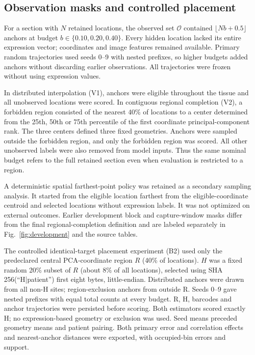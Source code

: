 \subsection{Observation masks and controlled placement}
For a section with $N$ retained locations, the observed set $\mathcal O$ contained $\lfloor Nb+0.5\rfloor$ anchors at budget $b\in\{0.10, 0.20, 0.40\}$. Every hidden location lacked its entire expression vector; coordinates and image features remained available. Primary random trajectories used seeds 0--9 with nested prefixes, so higher budgets added anchors without discarding earlier observations. All trajectories were frozen without using expression values.

In distributed interpolation (V1), anchors were eligible throughout the tissue and all unobserved locations were scored. In contiguous regional completion (V2), a forbidden region consisted of the nearest 40\% of locations to a center determined from the 25th, 50th or 75th percentile of the first coordinate principal-component rank. The three centers defined three fixed geometries. Anchors were sampled outside the forbidden region, and only the forbidden region was scored. All other unobserved labels were also removed from model inputs. Thus the same nominal budget refers to the full retained section even when evaluation is restricted to a region.

A deterministic spatial farthest-point policy was retained as a secondary sampling analysis. It started from the eligible location farthest from the eligible-coordinate centroid and selected locations without expression labels. It was not optimized on external outcomes. Earlier development block and capture-window masks differ from the final regional-completion definition and are labeled separately in Fig.~\ref{fig:development} and the source tables.

The controlled identical-target placement experiment (B2) used only the predeclared central PCA-coordinate region $R$ (40\% of locations). $H$ was a fixed random 20\% subset of $R$ (about 8\% of all locations), selected using SHA 256(``H|patient'') first eight bytes, little-endian. Distributed anchors were drawn from all non-H sites; region-exclusion anchors from outside R. Seeds 0--9 gave nested prefixes with equal total counts at every budget. R, H, barcodes and anchor trajectories were persisted before scoring. Both estimators scored exactly H; no expression-based geometry or exclusion was used. Seed means preceded geometry means and patient pairing. Both primary error and correlation effects and nearest-anchor distances were exported, with occupied-bin errors and support.


